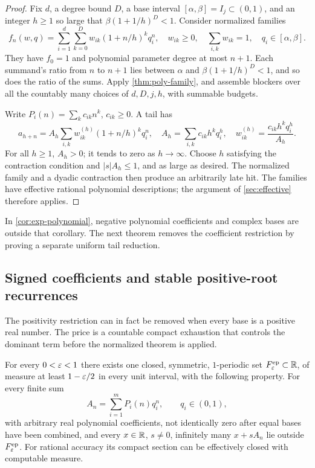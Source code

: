 \begin{proof}
Fix $d$, a degree bound $D$, a base interval $[\alpha,\beta]=I_j\subset(0,1)$,
and an integer $h\ge1$ so large that
$\beta(1+1/h)^D<1$. Consider normalized families
\[
 f_n(w,q)=\sum_{i=1}^d\sum_{k=0}^D
    w_{ik}(1+n/h)^kq_i^n,
 \quad w_{ik}\ge0,\quad\sum_{i,k}w_{ik}=1,
 \quad q_i\in[\alpha,\beta].
\]
They have $f_0=1$ and polynomial parameter degree at most $n+1$.
Each summand's ratio from $n$ to $n+1$ lies between $\alpha$ and
$\beta(1+1/h)^D<1$, and so does the ratio of the sums. Apply
\cref{thm:poly-family}, and assemble blockers over all the countably
many choices of $d,D,j,h$, with summable budgets.

Write $P_i(n)=\sum_k c_{ik}n^k$, $c_{ik}\ge0$. A tail has
\[
 a_{h+n}=A_h\sum_{i,k}w_{ik}^{(h)}(1+n/h)^kq_i^n,
 \quad
 A_h=\sum_{i,k}c_{ik}h^kq_i^h,
 \quad w_{ik}^{(h)}=\frac{c_{ik}h^kq_i^h}{A_h}.
\]
For all $h\ge1$, $A_h>0$; it tends to zero as $h\to\infty$.
Choose $h$ satisfying the contraction condition and $|s|A_h\le1$,
and as large as desired. The normalized family and a dyadic contraction
then produce an arbitrarily late hit. The families have effective
rational polynomial descriptions; the argument of
\cref{sec:effective} therefore applies.
\end{proof}

In \cref{cor:exp-polynomial}, negative polynomial coefficients and
complex bases are outside that corollary. The next theorem removes the
coefficient restriction by proving a separate uniform tail reduction.

\subsection{Signed coefficients and stable positive-root recurrences}

The positivity restriction can in fact be removed when every base is a
positive real number. The price is a countable compact exhaustion that
controls the dominant term before the normalized theorem is applied.

\begin{theorem}
\label{thm:signed-exp-poly}
For every $0<\varepsilon<1$ there exists one closed, symmetric, $1$-periodic
set $F^{\rm ep}_\varepsilon\subset\mathbb R$, of measure at least $1-\varepsilon/2$ in
every unit interval, with the following property. For every finite sum
\begin{equation}\label{eq:signed-exp-poly}
 A_n=\sum_{i=1}^m P_i(n)q_i^n,\qquad q_i\in(0,1),
\end{equation}
with arbitrary real polynomial coefficients, not identically zero
after equal bases have been combined, and every $x\in\mathbb R$, $s\ne0$,
infinitely many $x+sA_n$ lie outside $F^{\rm ep}_\varepsilon$.
For rational accuracy its compact section can be effectively closed
with computable measure.
\end{theorem}


